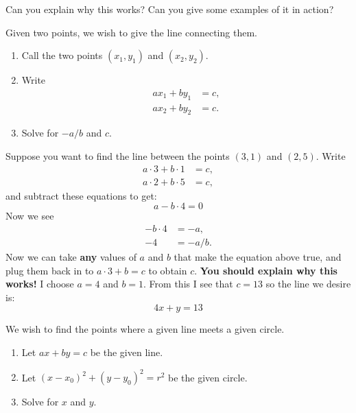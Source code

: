 \begin{question} 
Can you explain why this works? Can you give some examples of it in
action?
\end{question}
\QM

\begin{construction} 
Given two points, we wish to give the line connecting them.
\begin{enumerate}
\item Call the two points $(x_1,y_1)$ and $(x_2,y_2)$.
\item Write
\begin{align*}
ax_1 + by_1 &= c, \\
ax_2 + by_2 &= c.
\end{align*}
\item Solve for $-a/b$ and $c$. 
\end{enumerate}
\end{construction}

\begin{example}
Suppose you want to find the line between the points $(3,1)$ and
$(2,5)$. Write
\begin{align*}
a\cdot 3 + b\cdot 1 &= c, \\
a\cdot 2 + b\cdot 5 &= c,
\end{align*}
and subtract these equations to get:
\[
a - b\cdot 4 = 0
\]
Now we see 
\begin{align*}
-b\cdot 4 &= -a,\\
-4 &= -a/b.
\end{align*}
Now we can take \textbf{any} values of $a$ and $b$ that make the
equation above true, and plug them back in to $a\cdot 3 + b =c$ to
obtain $c$. \textbf{You should explain why this works!} I choose $a = 4$ and $b=1$. From this I see that $c = 13$ so the line we desire is:
\[
4x + y = 13
\]
\end{example}


\begin{construction} 
We wish to find the points where a given line meets a given
circle. 
\begin{enumerate} 
\item Let $ax + by = c$ be the given line.
\item Let $(x-x_0)^2 + (y-y_0)^2 = r^2$ be the given circle.
\item Solve for $x$ and $y$.
\end{enumerate}
\end{construction}

